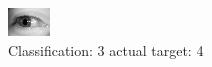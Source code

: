 \begin{figure}[h!]
\begin{center}
\includegraphics[width=0.60\columnwidth]{figures/ID3111_class_3_target_4.png}
\end{center}
\caption{ Classification: 3 actual target: 4}
\label{fig:ID3111_class_3_target_4}
\end{figure}
